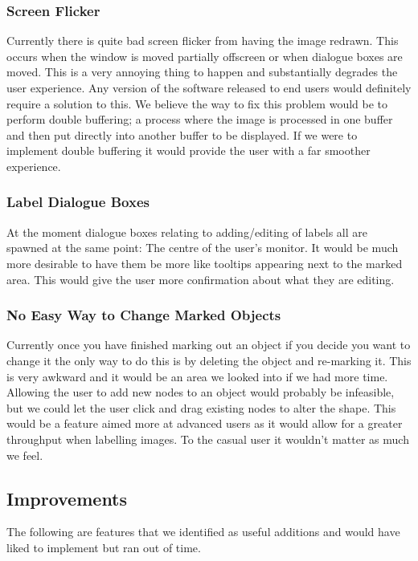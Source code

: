 \documentclass[a4paper,11pt,oneside]{article}
\begin{document}
\subsubsection{Screen Flicker}
Currently there is quite bad screen flicker from having the image redrawn.  This
occurs when the window is moved partially offscreen or when dialogue boxes are
moved.  This is a very annoying thing to happen and substantially degrades the
user experience. Any version of the software released to end users would
definitely require a solution to this.  We believe the way to fix this problem
would be to perform double buffering; a process where the image is processed in
one buffer and then put directly into another buffer to be displayed.  If we
were to implement double buffering it would provide the user with a far smoother
experience.

\subsubsection{Label Dialogue Boxes}
At the moment dialogue boxes relating to adding/editing of labels all are
spawned at the same point: The centre of the user's monitor.  It would be much
more desirable to have them be more like tooltips appearing next to the marked
area.  This would give the user more confirmation about what they are editing.

\subsubsection{No Easy Way to Change Marked Objects}
Currently once you have finished marking out an object if you decide you want to
change it the only way to do this is by deleting the object and re-marking it.
This is very awkward and it would be an area we looked into if we had more time.
Allowing the user to add new nodes to an object would probably be infeasible, 
but we could let the user click and drag existing nodes to alter the shape.  
This would be a feature aimed more at advanced users as it would allow for a
greater throughput when labelling images.  To the casual user it wouldn't matter
as much we feel.

\subsection{Improvements}
The following are features that we identified as useful additions and would have
liked to implement but ran out of time.
\end{document}
